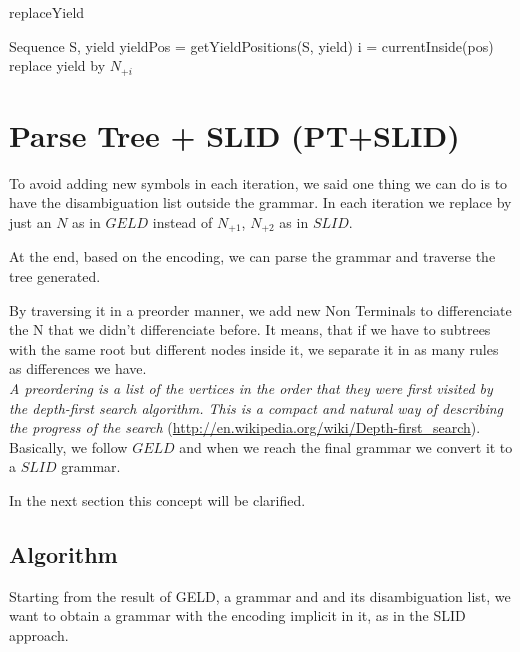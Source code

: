 	\begin{algorithm}
	\caption{replaceYield}
	\begin{algorithmic}[1]
	\REQUIRE Sequence S, yield
	\STATE yieldPos = getYieldPositions(S, yield)
		\STATE i = currentInside(pos)
		\STATE replace yield by $N_{+i}$ 
	\ENDFOR
	\end{algorithmic}
	\end{algorithm}

	\newpage

	\section{Parse Tree + SLID (PT+SLID)}

	To avoid adding new symbols in each iteration, we said one thing we can do is
	to have the disambiguation list outside the grammar. In each iteration we replace by just an $N$ as in $GELD$
	instead of $N_{+1}$, $N_{+2}$ as in $SLID$. 

	At the end, based on the encoding, we can parse the grammar and traverse the tree
	generated. 

	By traversing it in a preorder manner, we add new Non Terminals to differenciate 
	the N that we didn't differenciate before.  It means, that if we have to subtrees
	with the same root but different nodes inside it, we separate it in as many rules
	as differences we have.\\

	\emph{A preordering is a list of the vertices in the order that they were first visited by the depth-first search algorithm. This is a compact and natural way of describing the progress of the search} (\url{http://en.wikipedia.org/wiki/Depth-first_search}).\\

	Basically, we follow $GELD$ and when we reach the final grammar we convert it 
	to a $SLID$ grammar.

	In the next section	this concept will be clarified.

	\newpage


	\subsection{Algorithm}

	Starting from the result of GELD, a grammar and and its disambiguation list, we want to obtain
	a grammar with the encoding implicit in it, as in the SLID approach. \\

